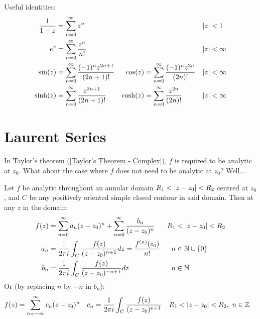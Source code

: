 \documentclass[12pt, english]{book}
\begin{document}
	Useful identities:
	\begin{align*}
		\frac{1}{1-z} &= \sum_{n=0}^{\infty} z^n  &&& \abs{z} &< 1 \\
		e^z &= \sum_{n=0}^{\infty} \frac{z^n}{n!} &&& \abs{z} &< \infty \\
		\sin(z) &=  \sum_{n=0}^{\infty} \frac{(-1)^n z^{2n+1}}{(2n+1)!} & 
		\cos(z) &=  \sum_{n=0}^{\infty} \frac{(-1)^n z^{2n}}{(2n)!} & \abs{z}&<\infty \\
		\sinh(z) &=  \sum_{n=0}^{\infty} \frac{z^{2n+1}}{(2n+1)!} & 
		\cosh(z) &=  \sum_{n=0}^{\infty} \frac{z^{2n}}{(2n)!} & \abs{z}&<\infty \\
 	\end{align*}
 
 	\section{Laurent Series} \label{Laurent Series Section - Complex}
	
	In Taylor's theorem (\cref{Taylor's Theorem - Complex}), \(f\) is required to be analytic at \(z_0\). What about the case where \(f\) does not need to be analytic at \(z_0\)? Well...
	
	\begin{theorem}
		\label{Laurent's Theorem - Complex}
		Let \(f\) be analytic throughout an annular domain \(R_1 < \abs{z-z_0}<R_2 \) centred at \(z_0\), and \(C\) be any positively oriented simple closed contour in said domain. Then at any \(z\) in the domain:
		\begin{align*}
			f(z) &= \sum_{n=0}^{\infty} a_n (z-z_0)^n + \sum_{n=0}^{\infty} \frac{b_n}{(z-z_0)^n} & R_1 &< \abs{z-z_0} < R_2 \\
			a_n &= \frac{1}{2\pi i} \int_{C} \frac{f(z)}{(z-z_0)^{n+1}} dz  
				 = \frac{f^{(n)}(z_0)}{n!}
				& n &\in \mathbb{N}\cup\{0\} \\
			b_n &= \frac{1}{2\pi i } \int_{C} \frac{f(z)}{(z-z_0)^{-n+1}} dz
				& n &\in \mathbb{N}
		\end{align*}
		Or (by replacing \(n\) by \(-n\) in \(b_n\)):
		\begin{align*}
			f(z) &= \sum_{n=-\infty}^{\infty} c_n (z-z_0)^n & 
			c_n &= \frac{1}{2\pi i} \int_{C} \frac{f(z)}{(z-z_0)^{n+1}} &
			R_1 &< \abs{z-z_0} < R_2, \ n \in \mathbb{Z} 
		\end{align*}
	\end{theorem}
\end{document}
